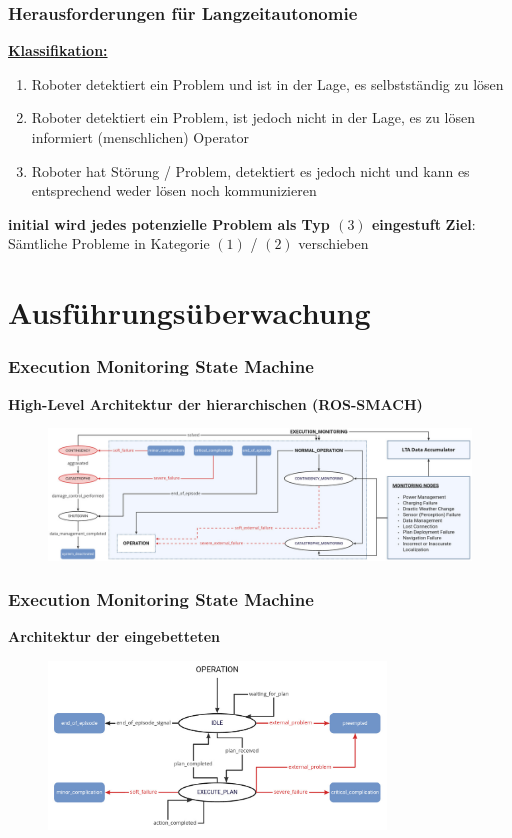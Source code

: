 \documentclass{beamer}
\begin{document}
\begin{frame}
  \frametitle{Herausforderungen für Langzeitautonomie}
  \textbf{\underline{Klassifikation:}}
  \begin{enumerate}
    \item Roboter detektiert ein Problem und ist in der Lage, es selbstständig zu lösen
    \item Roboter detektiert ein Problem, ist jedoch nicht in der Lage, es zu lösen \textrightarrow \thinspace informiert (menschlichen) Operator
    \item Roboter hat Störung / Problem, detektiert es jedoch nicht und kann es entsprechend weder lösen noch kommunizieren
  \end{enumerate}
  \textrightarrow \thinspace \textbf{initial wird jedes potenzielle Problem als Typ $(3)$ eingestuft}\newline
  \textbf{Ziel}: Sämtliche Probleme in Kategorie $(1)$ / $(2)$ verschieben
\end{frame}

\section{Ausführungsüberwachung}

\begin{frame}
  \frametitle{Execution Monitoring State Machine}
  \textbf{High-Level Architektur der hierarchischen  (ROS-SMACH)}
  \begin{figure}[H]
    \centering
    \includegraphics[width=\textwidth]{img/SMACH_high_level.png}
  \end{figure}
\end{frame}

\begin{frame}
  \frametitle{Execution Monitoring State Machine}
  \textbf{Architektur der eingebetteten }
  \begin{figure}[H]
    \centering
    \includegraphics[width=0.8\textwidth]{img/SMACH_low_level.png}
  \end{figure}
\end{frame}
\end{document}
